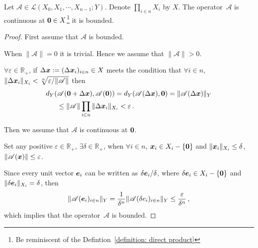 \documentclass[openany]{book}
\begin{document}
\begin{theorem}\label{theorem: continuous at zero iff bounded}
	Let $\mathscr A \in \mathcal L(X_0, X_1, \cdots, X_{n - 1}; Y)$.
	Denote $\prod_{i \in n} X_i$ by $X$.
	The operator~$\mathscr A$ is continuous at $\boldsymbol{0} \in X$\footnote{Be reminiscent of the Defintion~\ref{definition: direct product}}  it is bounded.
\end{theorem}
\begin{proof}
	First assume that $\mathscr A$ is bounded. 

	When $\|\mathscr A\| = 0$ it is trivial. 
	Hence we assume that $\|\mathscr A\| > 0$.
	
	$\forall \varepsilon \in \mathbb R_+$, if $\Delta \boldsymbol{x} := (\Delta \boldsymbol{x}_i)_{i \in n} \in X$ meets the condition that $\forall i \in n$, $\|\Delta \boldsymbol{x}_i\|_{X_i} < \sqrt[n]{\varepsilon / \|\mathscr A\|}$ then
	\begin{align*}
		d_Y(&\mathscr A(\boldsymbol{0} + \Delta \boldsymbol{x}), \mathscr A(\boldsymbol{0}))
		= d_Y(\mathscr A(\Delta \boldsymbol{x}), \boldsymbol{0})
		= \|\mathscr A(\Delta \boldsymbol{x})\|_Y
		\\
		&\leq \|\mathscr A\| \prod_{i \in n} \|\Delta \boldsymbol{x}_i\|_{X_i}
		< \varepsilon \,.
	\end{align*}

	Then we assume that $\mathscr A$ is continuous at $\boldsymbol{0}$.

	Set any positive $\varepsilon \in \mathbb R_+$, $\exists \delta \in \mathbb R_+$, when $\forall i \in n$, $\boldsymbol{x}_i \in X_i - \{\boldsymbol{0}\}$ and $\|\boldsymbol{x}_i\|_{X_i} \leq \delta$, $\|\mathscr A(\boldsymbol{x})\| \leq \varepsilon$. 

	Since every unit vector $\boldsymbol{e}_i$ can be written as $\delta \boldsymbol{e}_i / \delta$, where $\delta \boldsymbol{e}_i \in X_i - \{\boldsymbol{0}\}$ and $\|\delta \boldsymbol{e}_i\|_{X_i} = \delta$, then
	\begin{equation*}
		\|\mathscr A(\boldsymbol{e}_i)_{i \in n}\|_Y 
		= \frac 1 {\delta^n} \|\mathscr A(\delta e_i)_{i \in n}\|_Y
		\leq \frac \varepsilon {\delta^n}\,,
	\end{equation*}
	which implies that the operator~$\mathscr A$ is bounded.
\end{proof}
\end{document}
